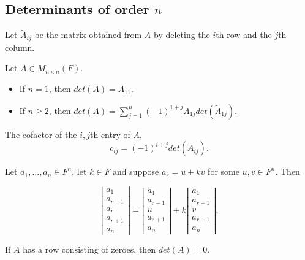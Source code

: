 \documentclass[12pt]{article}
\newenvironment{theorem}[2][Theorem]{\begin{trivlist}
\item[\hskip \labelsep {\bfseries #1}\hskip \labelsep {\bfseries #2.}]}{\end{trivlist}}
\newenvironment{corollary}[2][Corollary]{\begin{trivlist}
\item[\hskip \labelsep {\bfseries #1}\hskip \labelsep {\bfseries #2}]}{\end{trivlist}}
\newenvironment{definition}[2][Definition]{\begin{trivlist}
\item[\hskip \labelsep {\bfseries #1}\hskip \labelsep {\bfseries #2}]}{\end{trivlist}}
\begin{document}
\subsection{Determinants of order $n$}

Let $\tilde{A}_{ij}$ be the matrix obtained from $A$ by deleting the $i$th row and the $j$th column.

\begin{definition}{2}
Let $A \in M_{n \times n}(F)$.

\begin{itemize}
    \item If $n = 1$, then $det(A) = A_{11}$.
    
    \item If $n \geq 2$, then $det(A) = \sum_{j = 1}^n(-1)^{1 + j}A_{1j}det(\tilde{A}_{1j})$.
\end{itemize}
\end{definition}

\noindent The cofactor of the $i,j$th entry of $A$, $$c_{ij} = (-1)^{i + j}det(\tilde{A}_{ij}).$$

\begin{theorem}{4.3}
Let $a_1, \dots, a_n \in F^n$, let $k \in F$ and suppose $a_r = u + kv$ for some $u, v \in F^n$. Then

$$\left| \begin{array}{c}
     a_1 \\ a_{r-1} \\ a_r \\ a_{r+1} \\ a_n
\end{array} \right| = \left| \begin{array}{c}
     a_1 \\ a_{r-1} \\ u \\ a_{r+1} \\ a_n
\end{array} \right| + k\left| \begin{array}{c}
     a_1 \\ a_{r-1} \\ v \\ a_{r+1} \\ a_n
\end{array} \right|.$$
\end{theorem}

\begin{corollary}{4}
If $A$ has a row consisting of zeroes, then $det(A) = 0$.
\end{corollary}
\end{document}
